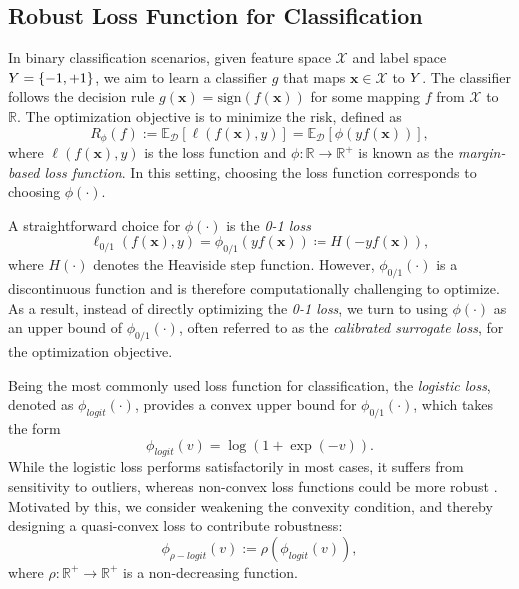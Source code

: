 \documentclass[sigconf,screen,nonacm]{acmart} \usepackage{booktabs}
\newcommand{\bs}{\boldsymbol}
\newcommand{\bx}{\bs{x}}
\newcommand{\bY}{\bs{Y}}
\begin{document}
\subsection{Robust Loss Function for Classification}
	In binary classification scenarios, given feature space $\mathcal X$ and label space $\mathcal \bY=\{-1,+1\}$, we aim to learn a classifier $g$ that maps $\bx\in\mathcal X$ to $\mathcal \bY$.
	The classifier follows the decision rule $g(\bx)=\text{sign}(f(\bx))$ for some mapping $f$ from $\mathcal X$ to $\mathbb R$.
The optimization objective is to minimize the risk, defined as
	\begin{equation}
	    R_{\phi}(f):=\mathbb E_{\mathcal D}[\ell(f(\bx),y)]=\mathbb E_{\mathcal D}[\phi(yf(\bx))],
	\end{equation}
	where $\ell(f(\bx),y)$ is the loss function and $\phi:\mathbb R\rightarrow\mathbb R^+$ is known as the \textit{margin-based loss function}.  In this setting, choosing the loss function corresponds to choosing $\phi(\cdot)$.
	
	A straightforward choice for $\phi(\cdot)$ is the \textit{0-1 loss}
	\begin{equation}
	\ell_{0/1}(f(\bx),y)= \phi_{0/1}(yf(\bx)) \coloneqq H(-yf(\bx)),
	\end{equation}
	where $H(\cdot)$ denotes the Heaviside step function.
	However, $\phi_{0/1}(\cdot)$ is a discontinuous function and is therefore computationally challenging to optimize.
	As a result, instead of directly optimizing the \textit{0-1 loss}, we turn to using $\phi(\cdot)$ as an upper bound of $\phi_{0/1}(\cdot)$, often referred to as the \textit{calibrated surrogate loss}, for the optimization objective.
	
	Being the most commonly used loss function for classification, the \textit{logistic loss}, denoted as $\phi_{logit}(\cdot)$, provides a convex upper bound for $\phi_{0/1}(\cdot)$, which takes the form
	\begin{equation}
		\phi_{logit}(v)=\log(1+\exp(-v)).
	\end{equation}
While the logistic loss performs satisfactorily in most cases, it suffers from sensitivity to outliers, whereas non-convex loss functions could be more robust \citep{masnadi2008design}. Motivated by this, we consider weakening the convexity condition, and thereby designing a quasi-convex loss to contribute robustness:
	\begin{equation}
		\phi_{\rho-logit}(v):=\rho(\phi_{logit}(v)),
	\end{equation}
	where $\rho:\mathbb R^+\rightarrow\mathbb R^+$ is a non-decreasing function.
	
\end{document}
